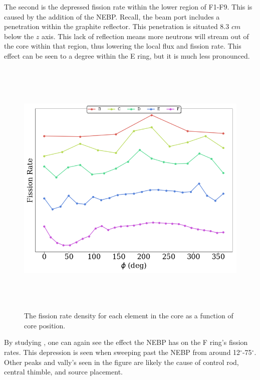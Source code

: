 The second is the depressed fission rate within the lower region of F1-F9.
This is caused by the addition of the NEBP.
Recall, the beam port includes a penetration within the graphite reflector. 
This penetration is situated 8.3 $cm$ below the $z$ axis.
This lack of reflection means more neutrons will stream out of the core within that region, thus lowering the local flux and fission rate.
This effect can be seen to a degree within the E ring, but it is much less pronounced.

\clearpage

\begin{figure}[htb]
\centering
\includegraphics[height=5in]{tex/figures/totals_azi.png}
\caption[Whole Core Azimuthal Fission Rate Density]{The fission rate density for each element in the core as a function of core position.}
\label{fig:totals_azi}
\end{figure}

By studying , one can again see the effect the NEBP has on the F ring's fission rates.
This depression is seen when sweeping past the NEBP from around 12$^{\circ}$-75$^{\circ}$.
Other peaks and vally's seen in the figure are likely the cause of control rod, central thimble, and source placement.



